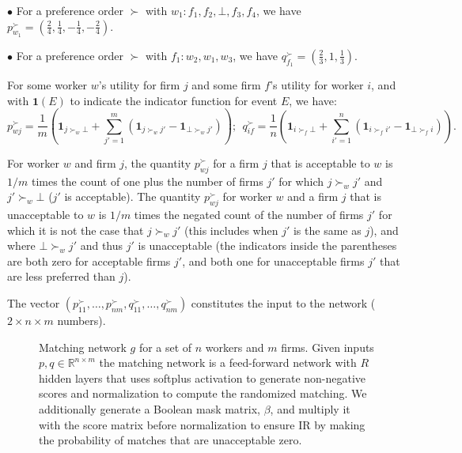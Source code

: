 \documentclass[11pt,letterpaper]{article}
\theoremstyle{definition}
\newcommand{\kibitz}[2]{\ifnum\Comments=1{\color{#1}{#2}}\fi}
\newcommand{\zf}[1]{\kibitz{blue}{[ZF: #1]}}
\newcommand{\dcp}[1]{\kibitz{orange}{[DCP: #1]}}
\begin{document}
 
 $\bullet$ For a preference order $\succ$ with $w_1: f_1, f_2, \bot, f_3, f_4$, we have $p^\succ_{w_1}=(\frac{2}{4},\frac{1}{4},-\frac{1}{4},-\frac{2}{4})$.
 
 
 $\bullet$ For a preference order $\succ$ with $f_1: w_2, w_1, w_3$, we have $q^\succ_{f_1}=(\frac{2}{3},1,\frac{1}{3})$.



For some worker $w$'s utility for firm $j$ and some firm $f$'s utility for worker $i$, and with $\mathbf{1}(E)$ to indicate the indicator function for event $E$,
we have:
%
\[
\!\! p_{wj}^\succ \!=\!  \frac{1}{m}\!\left(\! \mathbf{1}_{ j \succ_{w} \bot} + \sum_{j'=1}^{m} (\mathbf{1}_{j \succ_{w} j'} - \mathbf{1}_{\bot \succ_{w} j'}) \!\right);
\ \ 
q_{if}^\succ\! =\!  \frac{1}{n} \!\left( \mathbf{1}_{i \succ_{f} \bot} + \sum_{i'=1}^{n} (\mathbf{1}_{i \succ_{f} i'} - \mathbf{1}_{\bot \succ_{f} i})\!\right).
\]

For worker $w$ and firm $j$, the quantity  $p^\succ_{wj}$ 
for a firm $j$ that is acceptable to $w$ is  $1/m$  times the count of  one plus the number of firms $j'$  for which $j\succ_w j' $ and $j'\succ_w \bot$ ($j'$ is acceptable).
%
The quantity  $p^\succ_{wj}$ for worker $w$ and  a firm $j$ that is unacceptable to $w$ is  $1/m$  times the negated count of the number of 
 firms $j'$ for which it is not the case that $j\succ_w j'$ (this includes when $j'$ is the same as $j$), and where $\bot\succ_w j'$ and thus $j'$ is unacceptable (the indicators inside the parentheses are both zero for acceptable firms $j'$, and both one for unacceptable firms $j'$ that are less preferred than $j$).
 \fi
 

The vector $(p_{11}^\succ, \ldots, p_{nm}^\succ, q_{11}^\succ, \ldots, q_{nm}^\succ)$ constitutes the input to the  network ($2\times n \times m$ numbers).
%


%
\begin{figure}[t]
%
\centering

\caption{Matching network $g$ for a set of $n$ workers and $m$ firms. Given inputs $p, q \in \mathbb{R}^{n \times m}$ the matching network is a feed-forward  network with $R$ hidden layers that uses softplus activation to generate non-negative scores and normalization to compute the  randomized matching. We additionally generate a Boolean mask matrix, $\beta$, and multiply it with the score matrix before normalization to ensure IR by making the probability of matches that are unacceptable  zero.}
\label{fig:gen-net-2}
\vspace{-10pt}
\end{figure}
\end{document}
